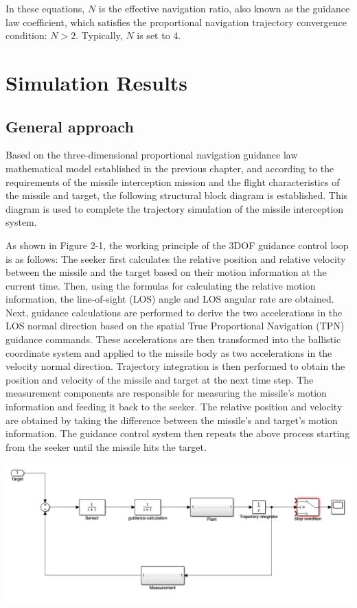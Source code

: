 \documentclass{article}
\begin{document}
In these equations, \( N \) is the effective navigation ratio, also known as the guidance law coefficient, which satisfies the proportional navigation trajectory convergence condition: \( N > 2 \). Typically, \( N \) is set to 4.




\newpage



\section{Simulation Results}


\subsection{General approach}


Based on the three-dimensional proportional navigation guidance law mathematical model established in the previous chapter, and according to the requirements of the missile interception mission and the flight characteristics of the missile and target, the following structural block diagram is established. This diagram is used to complete the trajectory simulation of the missile interception system.

As shown in Figure 2-1, the working principle of the 3DOF guidance control loop is as follows: The seeker first calculates the relative position and relative velocity between the missile and the target based on their motion information at the current time. Then, using the formulas for calculating the relative motion information, the line-of-sight (LOS) angle and LOS angular rate are obtained. Next, guidance calculations are performed to derive the two accelerations in the LOS normal direction based on the spatial True Proportional Navigation (TPN) guidance commands. These accelerations are then transformed into the ballistic coordinate system and applied to the missile body as two accelerations in the velocity normal direction. Trajectory integration is then performed to obtain the position and velocity of the missile and target at the next time step. The measurement components are responsible for measuring the missile's motion information and feeding it back to the seeker. The relative position and velocity are obtained by taking the difference between the missile's and target's motion information. The guidance control system then repeats the above process starting from the seeker until the missile hits the target.

\includegraphics[width=\textwidth]{Idea.png}
\end{document}
